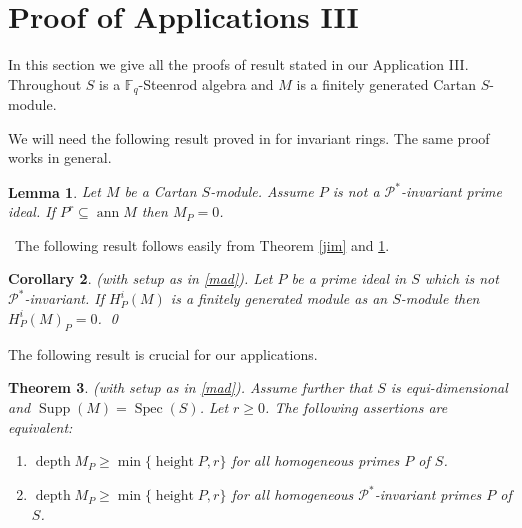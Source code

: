 \documentclass{amsart}
\newcommand{\F}{\mathbb{F} }
\newcommand{\Pc}{\mathcal{P} }
\newcommand{\Supp}{\operatorname{Supp}}
\newcommand{\depth}{\operatorname{depth}}
\newcommand{\height}{\operatorname{height}}
\newcommand{\ann}{\operatorname{ann}}
\newcommand{\Spec}{\operatorname{Spec}}
\theoremstyle{plain}
\newtheorem{theorem}{Theorem}[section]
\newtheorem{corollary}[theorem]{Corollary}
\newtheorem{lemma}[theorem]{Lemma}
\theoremstyle{definition}
\theoremstyle{remark}
\begin{document}
\section{Proof of Applications III}
\s\label{mad} In this section we give all the proofs of result stated in our Application III. Throughout $S$ is a $\F_q$-Steenrod algebra and $M$ is a finitely generated Cartan $S$-module. 

We will need the following result proved in \cite[8.2]{P} for invariant rings. The same proof works in general.
\begin{lemma}
\label{eclair} Let $M$ be a Cartan $S$-module. Assume $P$ is not a $\Pc^*$-invariant prime ideal. If $P^r \subseteq \ann M$ then $M_P = 0$.
\end{lemma}
\
The following result follows easily from Theorem \ref{jim} and \ref{eclair}.
\begin{corollary}
\label{stock}(with setup as in \ref{mad}). Let $P$ be a prime ideal in $S$ which is \emph{not} $\Pc^*$-invariant. If $H^i_P(M)$ is a finitely generated module as an $S$-module then $H^i_P(M)_P = 0$. \qed
\end{corollary}
The following result is crucial for our applications.
\begin{theorem}\label{crucial}
(with setup as in \ref{mad}). Assume further that $S$ is equi-dimensional and $\Supp(M) = \Spec(S)$. Let $r \geq 0$. The following assertions are equivalent:
\begin{enumerate}[\rm (i)]
\item
$\depth M_P \geq \min \{ \height P, r \}$ for all homogeneous primes $P$ of $S$.
\item
$\depth M_P \geq \min \{ \height P, r \}$ for all homogeneous $\Pc^*$-invariant primes $P$ of $S$.
\end{enumerate}
\end{theorem}
\end{document}

